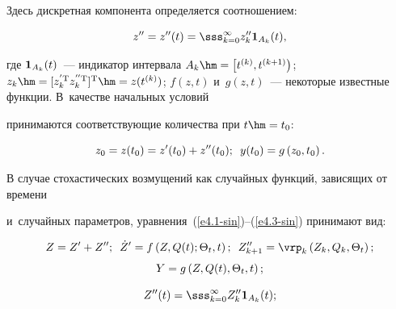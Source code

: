 Здесь дискретная компонента определяется соотношением:

\begin{equation}

z'' = z''(t) = \sss_{k=0}^\infty z_k'' {\bf 1}_{A_k} (t),\label{e4.2-sin}

\end{equation}

где $ {\bf 1}_{A_k} (t)$~--- индикатор интервала $A_k \hm=\left[ t^{(k)}, 

t^{(k+1)}\right)$; $z_k \hm= [ z_k^{'\mathrm{T}} z_{k}^{''\mathrm{T}}]^{\mathrm{T}} \hm= z(t^{(k)})$; $f(z,t)$ и~$g(z,t)$~--- некоторые известные функции. В~качестве начальных условий 

принимаются соответствующие количества при  $t\hm=t_0$:

\begin{equation}

z_0 = z(t_0) = z'(t_0) + z''(t_0);\enskip y(t_0) = g\left(z_0, t_0\right).\label{e4.3-sin}

\end{equation}



В случае стохастических возмущений как случайных функций, зависящих от времени 

и~случайных параметров, уравнения~(\ref{e4.1-sin})--(\ref{e4.3-sin}) принимают вид:

\begin{multline*}

Z=Z'+Z'';\enskip \dot Z' = f\left(Z, Q(t);\Theta_t, t\right);\enskip Z_{k+1}'' = 

\vrp_k \left(Z_k, Q_k,\Theta_t\right);\\[4pt]

Y= g\left(Z, Q(t),\Theta_t, t\right);


\end{multline*}



\vspace*{-9pt}



\noindent

\begin{equation*}

Z''(t) = \sss_{k=0}^\infty Z_k''  \mathbf{1}_{A_k} (t);


\end{equation*}

